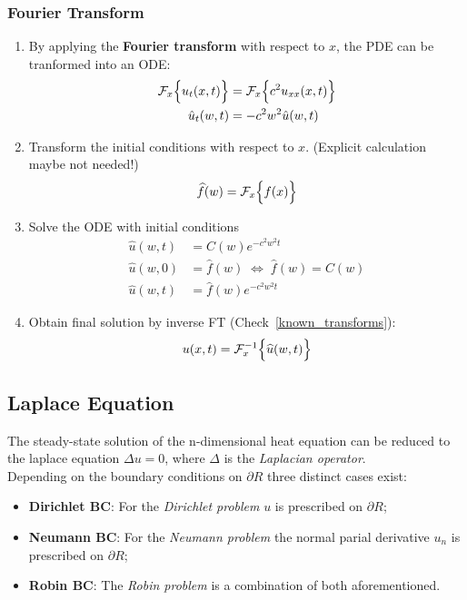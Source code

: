 \subsubsection{Fourier Transform}
\begin{enumerate}
    \item By applying the \textbf{Fourier transform} with respect to $x$, the PDE can be
          tranformed into an ODE:
          \begin{align*}
              \mathcal{F}_x\Bigl\{u_t(x,t)\Bigr\} & =\mathcal{F}_x\Bigl\{c^2u_{xx}(x,t)\Bigr\} \\
              \hat{u}_t(w,t)                      & =-c^2w^2\hat{u}(w,t)
          \end{align*}
    \item Transform the initial conditions with respect to $x$. (Explicit calculation maybe not needed!)
          \begin{equation*}
              \widehat{f}(w)=\mathcal{F}_x\Bigl\{f(x)\Bigr\}
          \end{equation*}
    \item Solve the ODE with initial conditions
          \begin{align*}
              \hat{u}(w,t) & =C(w)e^{-c^2w^2t}                             \\
              \hat{u}(w,0) & =\hat{f}(w)\;\Leftrightarrow\;\hat{f}(w)=C(w) \\
              \hat{u}(w,t) & =\hat{f}(w)e^{-c^2w^2t}
          \end{align*}
    \item Obtain final solution by inverse FT (Check~\ref*{known_transforms}):
          \begin{equation*}
              u(x,t)=\mathcal{F}_x^{-1}\Bigl\{\widehat{u}(w,t)\Bigr\}
          \end{equation*}
\end{enumerate}



\subsection{Laplace Equation}
The steady-state solution of the n-dimensional heat equation can be reduced
to the laplace equation $\Delta u=0$, where $\Delta$ is the \textit{Laplacian operator}.\\
Depending on the boundary conditions on $\partial R$ three distinct cases exist:
\begin{itemize}
    \item \textbf{Dirichlet BC}: For the \textit{Dirichlet problem} $u$ is prescribed on $\partial R$;
    \item \textbf{Neumann BC}: For the \textit{Neumann problem} the normal parial derivative $u_n$ is prescribed on $\partial R$;
    \item \textbf{Robin BC}: The \textit{Robin problem} is a combination of both aforementioned.
\end{itemize}

